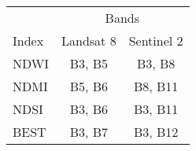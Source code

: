 
\begin{tabular}[t]{lcc}
\toprule
\multicolumn{1}{c}{} & \multicolumn{2}{c}{Bands} \\
\cmidrule(l{3pt}r{3pt}){2-3}
Index & Landsat 8 & Sentinel 2\\
\midrule
NDWI & B3, B5 & B3, B8\\
NDMI & B5, B6 & B8, B11\\
NDSI & B3, B6 & B3, B11\\
BEST & B3, B7 & B3, B12\\
\bottomrule
\end{tabular}
